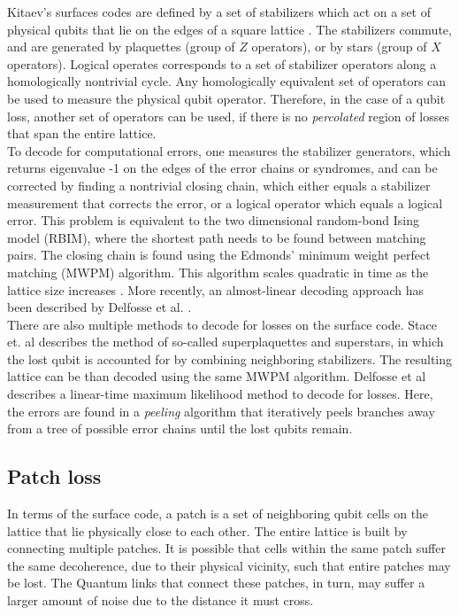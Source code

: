 Kitaev's surfaces codes are defined by a set of stabilizers which act on a set of physical qubits that lie on the edges of a square lattice \cite{kitaev}. The stabilizers commute, and are generated by plaquettes (group of $Z$ operators), or by stars (group of $X$ operators). Logical operates corresponds to a set of stabilizer operators along a homologically nontrivial cycle. Any homologically equivalent set of operators can be used to measure the physical qubit operator. Therefore, in the case of a qubit loss, another set of operators can be used, if there is no \emph{percolated} region of losses that span the entire lattice. \\

To decode for computational errors, one measures the stabilizer generators, which returns eigenvalue -1 on the edges of the error chains or syndromes, and can be corrected by finding a nontrivial closing chain, which either equals a stabilizer measurement that corrects the error, or a logical operator which equals a logical error. This problem is equivalent to the two dimensional random-bond Ising model (RBIM), where the shortest path needs to be found between matching pairs. The closing chain is found using the Edmonds' minimum weight perfect matching (MWPM) algorithm. This algorithm scales quadratic in time as the lattice size increases \cite{stace2009}. More recently, an almost-linear decoding approach has been described by Delfosse et al. \cite{nickerson2017}. \\

There are also multiple methods to decode for losses on the surface code. Stace et. al \cite{stace2009,stace2010} describes the method of so-called superplaquettes and superstars, in which the lost qubit is accounted for by combining neighboring stabilizers. The resulting lattice can be than decoded using the same MWPM algorithm. Delfosse et al \cite{delfosse2017} describes a linear-time maximum likelihood method to decode for losses. Here, the errors are found in a \emph{peeling} algorithm that iteratively peels branches away from a tree of possible error chains until the lost qubits remain.

\subsection*{Patch loss}
In terms of the surface code, a patch is a set of neighboring qubit cells on the lattice that lie physically close to each other. The entire lattice is built by connecting multiple patches. It is possible that cells within the same patch suffer the same decoherence, due to their physical vicinity, such that entire patches may be lost. The Quantum links that connect these patches, in turn, may suffer a larger amount of noise due to the distance it must cross. \\

